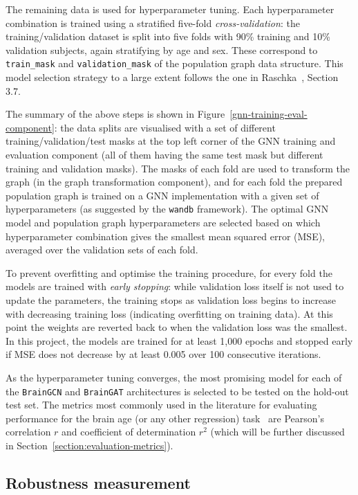 The remaining data is used for hyperparameter tuning. Each hyperparameter combination is trained using a stratified five-fold \textit{cross-validation}: the training/validation dataset is split into five folds with 90\% training and 10\% validation subjects, again stratifying by age and sex. These correspond to \texttt{train\_mask} and \texttt{validation\_mask} of the population graph data structure. This model selection strategy to a large extent follows the one in Raschka~\cite{raschka2018model}, Section 3.7.

The summary of the above steps is shown in Figure~\ref{gnn-training-eval-component}: the data splits are visualised with a set of different training/validation/test masks at the top left corner of the GNN training and evaluation component (all of them having the same test mask but different training and validation masks). The masks of each fold are used to transform the graph (in the graph transformation component), and for each fold the prepared population graph is trained on a GNN implementation with a given set of hyperparameters (as suggested by the \texttt{wandb} framework). The optimal GNN model and population graph hyperparameters are selected based on which hyperparameter combination gives the smallest mean squared error (MSE), averaged over the validation sets of each fold.

To prevent overfitting and optimise the training procedure, for every fold the models are trained with \textit{early stopping}: while validation loss itself is not used to update the parameters, the training stops as validation loss begins to increase with decreasing training loss (indicating overfitting on training data). At this point the weights are reverted back to when the validation loss was the smallest. In this project, the models are trained for at least 1,000 epochs and stopped early if MSE does not decrease by at least 0.005 over 100 consecutive iterations. 

As the hyperparameter tuning converges, the most promising model for each of the \texttt{BrainGCN} and \texttt{BrainGAT} architectures is selected to be tested on the hold-out test set. The metrics most commonly used in the literature for evaluating performance for the brain age (or any other regression) task~\cite{pervaiz2020optimising, niu2019improved} are Pearson's correlation $r$ and coefficient of determination $r^2$ (which will be further discussed in Section~\ref{section:evaluation-metrics}).

\subsection{Robustness measurement}
\label{section:implementation-robustness}

